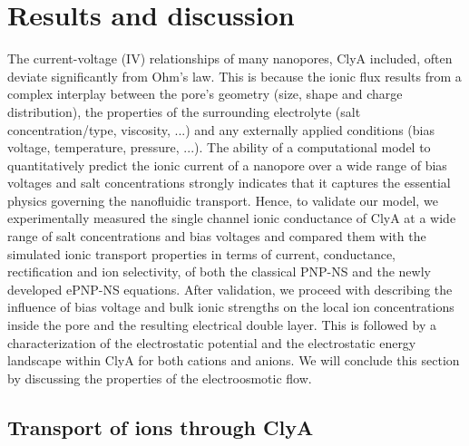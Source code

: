 \documentclass[journal=ancac3,manuscript=article,etalmode=truncate,maxauthors=0,layout=onecolumn]{achemso}
\begin{document}
\section{Results and discussion}\label{sec:results}

The current-voltage (IV) relationships of many nanopores, ClyA included, often
deviate significantly from Ohm's law. This is because the ionic flux results
from a complex interplay between the pore's geometry (size, shape and charge
distribution), the properties of the surrounding electrolyte (salt
concentration/type, viscosity, ...) and any externally applied conditions (bias
voltage, temperature, pressure, ...). The ability of a computational model to
quantitatively predict the ionic current of a nanopore over a wide range of bias
voltages and salt concentrations strongly indicates that it captures the
essential physics governing the nanofluidic transport. Hence, to validate our
model, we experimentally measured the single channel ionic conductance of ClyA
at a wide range of salt concentrations and bias voltages and compared them with
the simulated ionic transport properties in terms of current, conductance,
rectification and ion selectivity, of both the classical PNP-NS and the newly
developed ePNP-NS equations. After validation, we proceed with describing the
influence of bias voltage and bulk ionic strengths on the local ion
concentrations inside the pore and the resulting electrical double layer. This
is followed by a characterization of the electrostatic potential and the
electrostatic energy landscape within ClyA for both cations and anions. We will
conclude this section by discussing the properties of the electroosmotic flow.

\subsection{Transport of ions through ClyA}\label{sec:iont}


\end{document}
